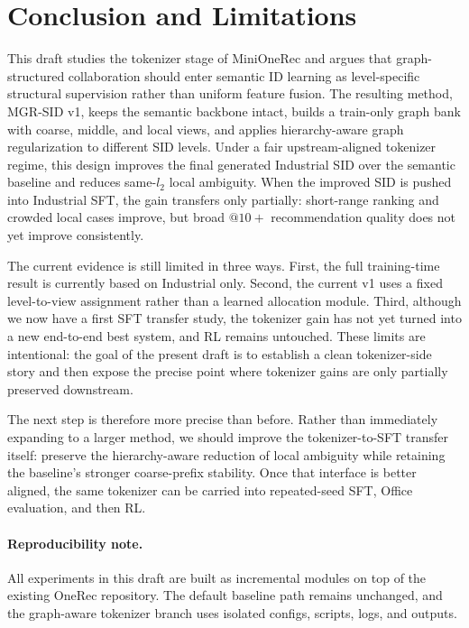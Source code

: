 \section{Conclusion and Limitations}
\label{sec:conclusion}

This draft studies the tokenizer stage of MiniOneRec and argues that graph-structured collaboration should enter semantic ID learning as level-specific structural supervision rather than uniform feature fusion. The resulting method, MGR-SID v1, keeps the semantic \rqvae{} backbone intact, builds a train-only graph bank with coarse, middle, and local views, and applies hierarchy-aware graph regularization to different SID levels. Under a fair upstream-aligned tokenizer regime, this design improves the final generated Industrial SID over the semantic baseline and reduces same-$l_2$ local ambiguity. When the improved SID is pushed into Industrial SFT, the gain transfers only partially: short-range ranking and crowded local cases improve, but broad $@10+$ recommendation quality does not yet improve consistently.

The current evidence is still limited in three ways. First, the full training-time result is currently based on Industrial only. Second, the current v1 uses a fixed level-to-view assignment rather than a learned allocation module. Third, although we now have a first SFT transfer study, the tokenizer gain has not yet turned into a new end-to-end best system, and RL remains untouched. These limits are intentional: the goal of the present draft is to establish a clean tokenizer-side story and then expose the precise point where tokenizer gains are only partially preserved downstream.

The next step is therefore more precise than before. Rather than immediately expanding to a larger method, we should improve the tokenizer-to-SFT transfer itself: preserve the hierarchy-aware reduction of local ambiguity while retaining the baseline's stronger coarse-prefix stability. Once that interface is better aligned, the same tokenizer can be carried into repeated-seed SFT, Office evaluation, and then RL.

\paragraph{Reproducibility note.}
All experiments in this draft are built as incremental modules on top of the existing OneRec repository. The default baseline path remains unchanged, and the graph-aware tokenizer branch uses isolated configs, scripts, logs, and outputs.
